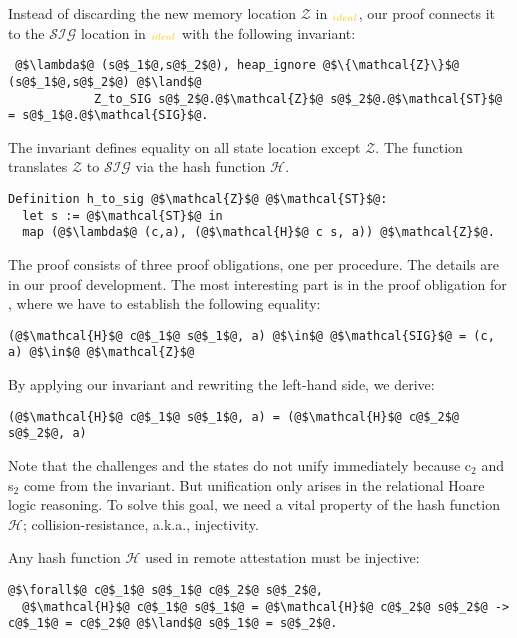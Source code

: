 \begin{IEEEproof}
    Instead of discarding the new memory location
    $\mathcal{Z}$ in \pattprim$_{\ideal}$, our proof 
    connects it to the $\mathcal{SIG}$ 
    location in \psigprim$_{\ideal}$ with the
    following invariant:
\begin{verbatim}
 @$\lambda$@ (s@$_1$@,s@$_2$@), heap_ignore @$\{\mathcal{Z}\}$@ (s@$_1$@,s@$_2$@) @$\land$@
            Z_to_SIG s@$_2$@.@$\mathcal{Z}$@ s@$_2$@.@$\mathcal{ST}$@ = s@$_1$@.@$\mathcal{SIG}$@.
\end{verbatim}
    The \hignore invariant defines equality on
    all state location except $\mathcal{Z}$.
    The function \ztosig translates $\mathcal{Z}$
    to $\mathcal{SIG}$ via the hash function $\mathcal{H}$.
\begin{verbatim}
Definition h_to_sig @$\mathcal{Z}$@ @$\mathcal{ST}$@:
  let s := @$\mathcal{ST}$@ in
  map (@$\lambda$@ (c,a), (@$\mathcal{H}$@ c s, a)) @$\mathcal{Z}$@.
\end{verbatim}
    The proof consists of three proof obligations, one per procedure.
    The details are in our proof development.
    The most interesting part is in the proof obligation
    for \everifya, where we have to establish the
    following equality:
\begin{verbatim}
(@$\mathcal{H}$@ c@$_1$@ s@$_1$@, a) @$\in$@ @$\mathcal{SIG}$@ = (c, a) @$\in$@ @$\mathcal{Z}$@ 
\end{verbatim}
    By applying our invariant and rewriting the left-hand side, we derive:
\begin{verbatim}
(@$\mathcal{H}$@ c@$_1$@ s@$_1$@, a) = (@$\mathcal{H}$@ c@$_2$@ s@$_2$@, a) 
\end{verbatim}
    Note that the challenges and the states do not
    unify immediately because c$_2$ and s$_2$ come from
    the invariant.
    But unification only arises in the relational Hoare logic
    reasoning.
    To solve this goal, we need a vital property of the hash
    function $\mathcal{H}$; collision-resistance, a.k.a., injectivity.
\end{IEEEproof}
%
\begin{hypothesis}
    Any hash function $\mathcal{H}$ used in remote attestation
    must be injective:
    \begin{center}
    \begin{minipage}{0.7\columnwidth}
\begin{verbatim}
@$\forall$@ c@$_1$@ s@$_1$@ c@$_2$@ s@$_2$@,
  @$\mathcal{H}$@ c@$_1$@ s@$_1$@ = @$\mathcal{H}$@ c@$_2$@ s@$_2$@ -> c@$_1$@ = c@$_2$@ @$\land$@ s@$_1$@ = s@$_2$@.
\end{verbatim}
    \end{minipage}
    \end{center}
\end{hypothesis}
